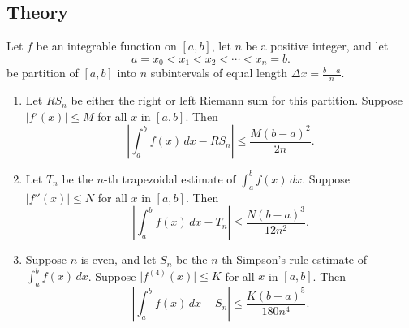 \subsection*{Theory}
\begin{namedtheorem} Let $f$ be an integrable function on $[a,b]$, let $n$ be a positive integer, and let
  \[
  a=x_0< x_1< x_2<\cdots < x_n=b.
  \]
  be partition of $[a,b]$ into $n$ subintervals of equal length $\Delta x=\frac{b-a}{n}$.
  \begin{enumerate}
    \item Let $RS_n$ be either the right or left Riemann sum for this partition. Suppose $\vert f'(x)\vert \leq M$ for all $x$ in $[a,b]$. Then
    \[
    \left\vert\int_a^b f(x)\, dx - RS_n\right\vert\leq \frac{M(b-a)^2}{2n}.
    \]
    \item Let $T_n$ be the $n$-th trapezoidal estimate of $\int_a^b f(x)\, dx$. Suppose $\vert f''(x)\vert\leq N$ for all $x$ in $[a,b]$. Then
    \[
    \left\vert\int_a^b f(x)\, dx - T_n\right\vert\leq\frac{N(b-a)^3}{12n^2}.
    \]
    \item Suppose $n$ is even, and let $S_n$ be the $n$-th Simpson's rule estimate of $\int_a^bf(x)\, dx$. Suppose $\vert f^{(4)}(x)\vert\leq K$ for all $x$ in $[a,b]$. Then
    \[
    \left\vert\int_a^b f(x)\, dx - S_n\right\vert\leq\frac{K(b-a)^5}{180n^4}.
    \]
  \end{enumerate}

\end{namedtheorem}

